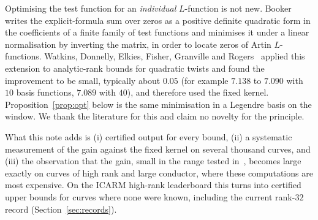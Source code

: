 \documentclass[11pt]{amsart}
\renewcommand{\S}{\ensuremath{\mathsection}}
\theoremstyle{remark}
\theoremstyle{definition}
\begin{document}
Optimising the test function for an \emph{individual} $L$-function is not new. Booker~\cite[\S3]{Booker} writes the explicit-formula sum over zeros as a positive definite quadratic form in the coefficients of a finite family of test functions and minimises it under a linear normalisation by inverting the matrix, in order to locate zeros of Artin $L$-functions. Watkins, Donnelly, Elkies, Fisher, Granville and Rogers~\cite[\S7]{Watkins} applied this extension to analytic-rank bounds for quadratic twists and found the improvement to be small, typically about $0.05$ (for example $7.138$ to $7.090$ with $10$ basis functions, $7.089$ with $40$), and therefore used the fixed kernel. Proposition~\ref{prop:opt} below is the same minimisation in a Legendre basis on the window. We thank the literature for this and claim no novelty for the principle.

What this note adds is (i) certified output for every bound, (ii) a systematic measurement of the gain against the fixed kernel on several thousand curves, and (iii) the observation that the gain, small in the range tested in~\cite{Watkins}, becomes large exactly on curves of high rank and large conductor, where these computations are most expensive. On the ICARM high-rank leaderboard this turns into certified upper bounds for curves where none were known, including the current rank-$32$ record (Section~\ref{sec:records}).
\end{document}
